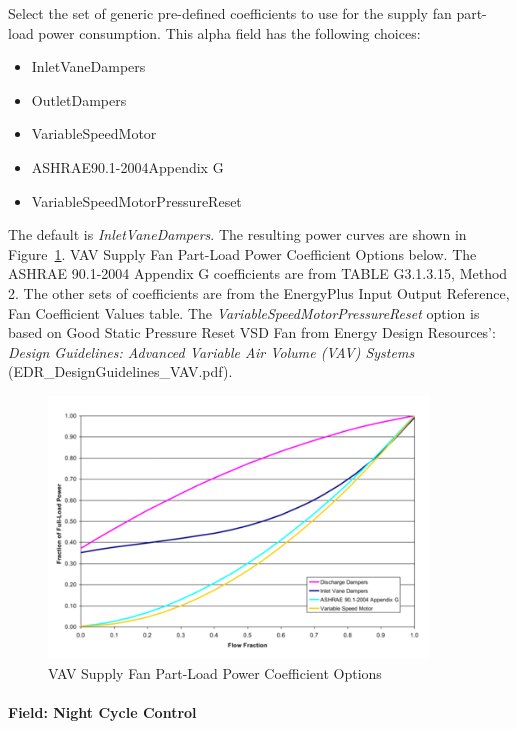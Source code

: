 Select the set of generic pre-defined coefficients to use for the supply fan part-load power consumption. This alpha field has the following choices:

\begin{itemize}
\item
  InletVaneDampers
\item
  OutletDampers
\item
  VariableSpeedMotor
\item
  ASHRAE90.1-2004Appendix G
\item
  VariableSpeedMotorPressureReset
\end{itemize}

The default is \emph{InletVaneDampers}. The resulting power curves are shown in Figure~\ref{fig:vav-supply-fan-part-load-power-coefficient}. VAV Supply Fan Part-Load Power Coefficient Options below. The ASHRAE 90.1-2004 Appendix G coefficients are from TABLE G3.1.3.15, Method 2. The other sets of coefficients are from the EnergyPlus Input Output Reference, Fan Coefficient Values table. The \emph{VariableSpeedMotorPressureReset} option is based on Good Static Pressure Reset VSD Fan from Energy Design Resources': \emph{Design Guidelines: Advanced Variable Air Volume (VAV) Systems} (EDR\_DesignGuidelines\_VAV.pdf).

\begin{figure}[hbtp] %
\centering
\includegraphics[width=0.9\textwidth, height=0.9\textheight, keepaspectratio=true]{media/image611.png}
\caption{VAV Supply Fan Part-Load Power Coefficient Options \protect \label{fig:vav-supply-fan-part-load-power-coefficient}}
\end{figure}

\paragraph{Field: Night Cycle Control}\label{field-night-cycle-control-2}

